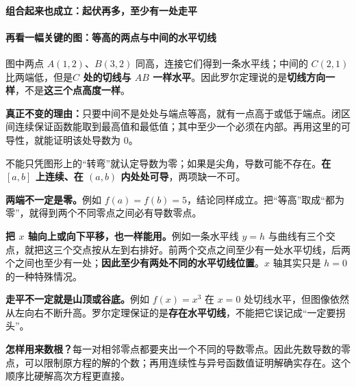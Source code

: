 \begin{explanationbox}
\par\medskip
\noindent\begin{minipage}{\linewidth}
\paragraph{组合起来也成立：起伏再多，至少有一处走平}
\begin{center}\end{center}
\end{minipage}\par\medskip


\paragraph{再看一幅关键的图：等高的两点与中间的水平切线}
\begin{center}\end{center}

图中两点 $A(1,2)$、$B(3,2)$ 同高，连接它们得到一条水平线；中间的 $C(2,1)$ 比两端低，但是\textbf{$C$ 处的切线与 $AB$ 一样水平}。因此罗尔定理说的是\textbf{切线方向一样}，不是\textbf{这三个点高度一样}。

\textbf{真正不变的理由：}只要中间不是处处与端点等高，就有一点高于或低于端点。闭区间连续保证函数能取到最高值和最低值；其中至少一个必须在内部。再用这里的可导性，就能证明该处导数为 $0$。

不能只凭图形上的“转弯”就认定导数为零；如果是尖角，导数可能不存在。\textbf{在 $[a,b]$ 上连续、在 $(a,b)$ 内处处可导}，两项缺一不可。

\textbf{两端不一定是零。}例如 $f(a)=f(b)=5$，结论同样成立。把“等高”取成“都为零”，就得到两个不同零点之间必有导数零点。

\textbf{把 $x$ 轴向上或向下平移，也一样能用。}例如一条水平线 $y=h$ 与曲线有三个交点，就把这三个交点按从左到右排好。前两个交点之间至少有一处水平切线，后两个之间也至少有一处；\textbf{因此至少有两处不同的水平切线位置}。$x$ 轴其实只是 $h=0$ 的一种特殊情况。

\textbf{走平不一定就是山顶或谷底。}例如 $f(x)=x^3$ 在 $x=0$ 处切线水平，但图像依然从左向右不断升高。罗尔定理保证的是\textbf{存在水平切线}，不能把它误记成“一定要拐头”。


\textbf{怎样用来数根？}每一对相邻零点都要夹出一个不同的导数零点。因此先数导数的零点，可以限制原方程的解的个数；再用连续性与异号函数值证明解确实存在。这个顺序比硬解高次方程更直接。
\end{explanationbox}


